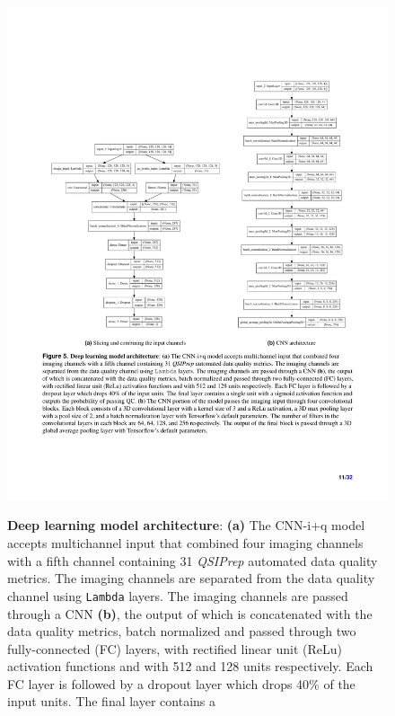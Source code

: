 \documentclass[fleqn,10pt,inline]{wlscirep}
\begin{document}
\begin{figure}[tbp]
    \centering
    {\label{fig:dl-architecture:complete}}
    {\label{fig:dl-architecture:cnn}}
    \includegraphics[width=\linewidth]{deep-learning-qc/model_combined.pdf}
    \caption{%
        {\bf Deep learning model architecture}:
        \textbf{(a)} The CNN-i+q model accepts multichannel input that combined
        four imaging channels with a fifth channel containing 31 \emph{QSIPrep}
        automated data quality metrics. The imaging channels are separated from the data quality
        channel using \texttt{Lambda} layers. The imaging channels are passed
        through a CNN \textbf{(b)}, the output of which is concatenated with the
        data quality metrics, batch normalized and passed through two fully-connected (FC)
        layers, with rectified linear unit (ReLu) activation functions and with
        512 and 128 units respectively. Each FC layer is followed by a dropout
        layer which drops 40\% of the input units. The final layer contains a
}
\end{figure}
\end{document}
